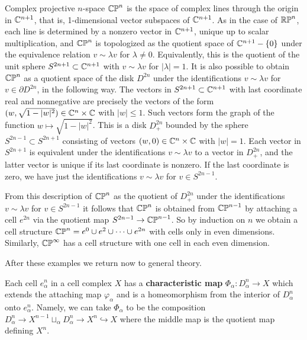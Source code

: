 \begin{example}
\label{ex:complex-projective-space-cw}
Complex projective $n$-space $\mathbb{CP}^n$ is the space of complex lines through the origin
in $\mathbb{C}^{n+1}$, that is, 1-dimensional vector subspaces of $\mathbb{C}^{n+1}$. As in the case of $\mathbb{RP}^n$,
each line is determined by a nonzero vector in $\mathbb{C}^{n+1}$, unique up to scalar
multiplication, and $\mathbb{CP}^n$ is topologized as the quotient space of $\mathbb{C}^{n+1} - \{0\}$ under the
equivalence relation $v \sim \lambda v$ for $\lambda \ne 0$. Equivalently, this is the quotient of the
unit sphere $S^{2n+1} \subset \mathbb{C}^{n+1}$ with $v \sim \lambda v$ for $|\lambda| = 1$. It is also possible to obtain
$\mathbb{CP}^n$ as a quotient space of the disk $D^{2n}$ under the identifications $v \sim \lambda v$ for
$v \in \partial D^{2n}$, in the following way. The vectors in $S^{2n+1} \subset \mathbb{C}^{n+1}$ with last
coordinate real and nonnegative are precisely the vectors of the form
$(w, \sqrt{1-|w|^2}) \in \mathbb{C}^n \times \mathbb{C}$ with $|w| \le 1$. Such vectors form the graph of the
function $w \mapsto \sqrt{1-|w|^2}$. This is a disk $D_+^{2n}$ bounded by the sphere
$S^{2n-1} \subset S^{2n+1}$ consisting of vectors $(w,0) \in \mathbb{C}^n \times \mathbb{C}$ with $|w| = 1$. Each vector in
$S^{2n+1}$ is equivalent under the identifications $v \sim \lambda v$ to a vector in $D_+^{2n}$, and the
latter vector is unique if its last coordinate is nonzero. If the last coordinate is zero,
we have just the identifications $v \sim \lambda v$ for $v \in S^{2n-1}$.

From this description of $\mathbb{CP}^n$ as the quotient of $D_+^{2n}$ under the identifications
$v \sim \lambda v$ for $v \in S^{2n-1}$ it follows that $\mathbb{CP}^n$ is obtained from $\mathbb{CP}^{n-1}$ by attaching a
cell $e^{2n}$ via the quotient map $S^{2n-1} \to \mathbb{CP}^{n-1}$. So by induction on $n$ we obtain a
cell structure $\mathbb{CP}^n = e^0 \cup e^2 \cup \cdots \cup e^{2n}$ with cells only in even dimensions.
Similarly, $\mathbb{CP}^\infty$ has a cell structure with one cell in each even dimension.
\end{example}

After these examples we return now to general theory.

\begin{definition}
\label{def:characteristic-map}
Each cell $e_\alpha^n$ in a cell complex $X$ has a \textbf{characteristic map}
$\Phi_\alpha : D_\alpha^n \to X$ which extends the attaching map $\varphi_\alpha$ and is a homeomorphism
from the interior of $D_\alpha^n$ onto $e_\alpha^n$. Namely, we can take $\Phi_\alpha$ to be the
composition $D_\alpha^n \to X^{n-1} \sqcup_\alpha D_\alpha^n \to X^n \hookrightarrow X$ where the middle map is the
quotient map defining $X^n$.
\end{definition}

